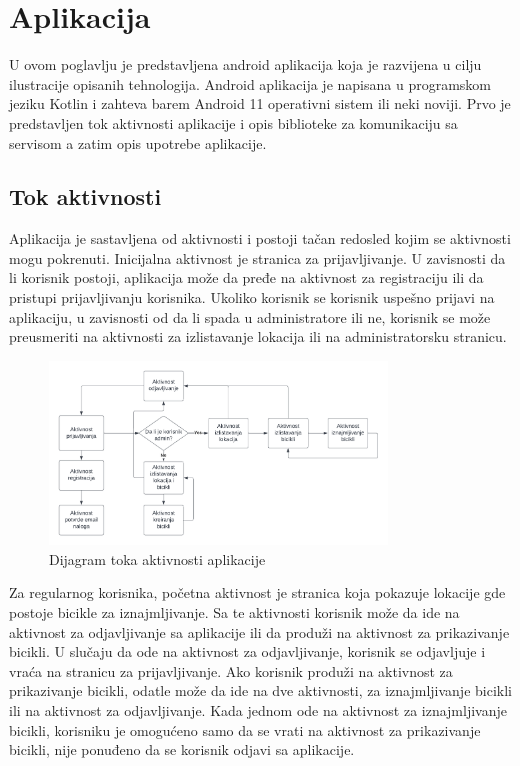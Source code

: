 \documentclass[12pt,oneside]{memoir}
\begin{document}
\section{Aplikacija}
U ovom poglavlju je predstavljena android aplikacija koja je razvijena u cilju ilustracije opisanih tehnologija. Android aplikacija je napisana u programskom jeziku Kotlin i zahteva barem Android 11 operativni sistem ili neki noviji. Prvo je predstavljen tok aktivnosti aplikacije i opis biblioteke za komunikaciju sa servisom a zatim opis upotrebe aplikacije.
 
\subsection{Tok aktivnosti}
 
Aplikacija je sastavljena od aktivnosti i postoji tačan redosled kojim se aktivnosti mogu pokrenuti. Inicijalna aktivnost je stranica za prijavljivanje. U zavisnosti da li korisnik postoji, aplikacija može da pređe na aktivnost za registraciju ili da pristupi prijavljivanju korisnika. Ukoliko korisnik se korisnik uspešno prijavi na aplikaciju, u zavisnosti od da li spada u administratore ili ne, korisnik se može preusmeriti na aktivnosti za izlistavanje lokacija ili na administratorsku stranicu.
 
\begin{figure}[!ht]
  \centering
  \includegraphics[width=0.8\textwidth]{Organizacija aktivnosti.png}
  \caption{Dijagram toka aktivnosti aplikacije}
  \label{fig:tokAktivnostiApplikacije}
\end{figure}
 
Za regularnog korisnika, početna aktivnost je stranica koja pokazuje lokacije gde postoje bicikle za iznajmljivanje. Sa te aktivnosti korisnik može da ide na aktivnost za odjavljivanje sa aplikacije ili da produži na aktivnost za prikazivanje bicikli. U slučaju da ode na aktivnost za odjavljivanje, korisnik se odjavljuje i vraća na stranicu za prijavljivanje. Ako korisnik produži na aktivnost za prikazivanje bicikli, odatle može da ide na dve aktivnosti, za iznajmljivanje bicikli ili na aktivnost za odjavljivanje. Kada jednom ode na aktivnost za iznajmljivanje bicikli, korisniku je omogućeno samo da se vrati na aktivnost za prikazivanje bicikli, nije ponuđeno da se korisnik odjavi sa aplikacije.
 
\end{document}

